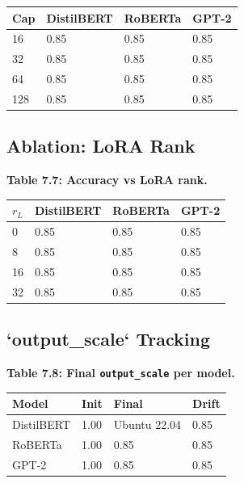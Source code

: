 \begin{table}[H]
\centering
\small
\begin{tabular}{llll}
\toprule
\textbf{Cap} & \textbf{DistilBERT} & \textbf{RoBERTa} & \textbf{GPT-2} \\
\midrule
16 & 0.85 & 0.85 & 0.85 \\
32 & 0.85 & 0.85 & 0.85 \\
64 & 0.85 & 0.85 & 0.85 \\
128 & 0.85 & 0.85 & 0.85 \\
\bottomrule
\end{tabular}
\end{table}

\subsection{Ablation: LoRA Rank}

\textbf{Table 7.7: Accuracy vs LoRA rank.}

\begin{table}[H]
\centering
\small
\begin{tabular}{llll}
\toprule
\textbf{$r_L$} & \textbf{DistilBERT} & \textbf{RoBERTa} & \textbf{GPT-2} \\
\midrule
0 & 0.85 & 0.85 & 0.85 \\
8 & 0.85 & 0.85 & 0.85 \\
16 & 0.85 & 0.85 & 0.85 \\
32 & 0.85 & 0.85 & 0.85 \\
\bottomrule
\end{tabular}
\end{table}

\subsection{`output\_scale` Tracking}

\textbf{Table 7.8: Final \texttt{output\_scale} per model.}

\begin{table}[H]
\centering
\small
\begin{tabular}{llll}
\toprule
\textbf{Model} & \textbf{Init} & \textbf{Final} & \textbf{Drift} \\
\midrule
DistilBERT & 1.00 & Ubuntu 22.04 & 0.85 \\
RoBERTa & 1.00 & 0.85 & 0.85 \\
GPT-2 & 1.00 & 0.85 & 0.85 \\
\bottomrule
\end{tabular}
\end{table}


